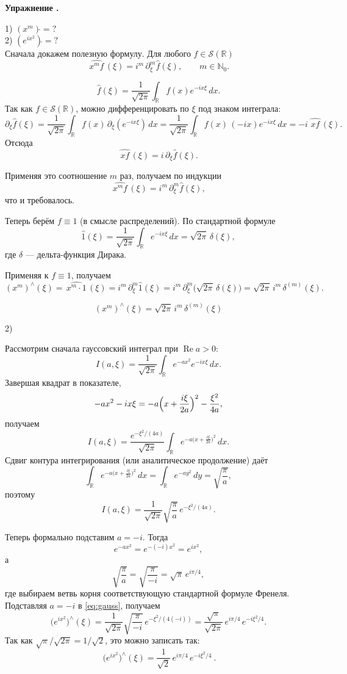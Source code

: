 \documentclass[11pt,a4paper]{report}
\numberwithin{equation}{section}
\numberwithin{figure}{chapter}
\numberwithin{table}{chapter}
\newif\ifinmathphysstatement
\newenvironment{myexe}[1][]{%
    \refstepcounter{exectr}%
    \inmathphysstatementtrue
    \begin{tcolorbox}[mathphysblock,colframe=exercisecolor,colback=exercisecolor!3,#1]
    \textbf{\color{exercisecolor}Упражнение \theexectr.}\par\smallskip
}{%
    \end{tcolorbox}
    \inmathphysstatementfalse
}
\newcommand{\R}{\mathbb{R}}
\newcommand{\SR}{\mathcal{S}(\R)}
\begin{document}
\begin{myexe}
    1) $(x^m)\hat{}=?$ \\ 
    2) $(e^{ix^2})\hat{}=?$ \\
    Сначала докажем полезную формулу. Для любого $f\in \SR$
\[
\widehat{\,x^m f\,}(\xi)=i^m\,\partial_\xi^m\widehat f(\xi),\qquad m\in\mathbb N_0.
\]


\[
\widehat f(\xi)=\frac1{\sqrt{2\pi}}\int_{\R} f(x)e^{-ix\xi}\,dx.
\]
Так как $f\in \SR$, можно дифференцировать по $\xi$ под знаком
интеграла:
\[
\partial_\xi\widehat f(\xi)
 =\frac1{\sqrt{2\pi}}\int_{\R} f(x)\,\partial_\xi(e^{-ix\xi})\,dx
 =\frac1{\sqrt{2\pi}}\int_{\R} f(x)\,(-ix)e^{-ix\xi}\,dx
 =-i\,\widehat{\,x f\,}(\xi).
\]
Отсюда
\[
\widehat{\,x f\,}(\xi)=i\,\partial_\xi\widehat f(\xi).
\]

Применяя это соотношение $m$ раз, получаем по индукции
\[
\widehat{\,x^m f\,}(\xi)
=i^m\,\partial_\xi^m\widehat f(\xi),
\]
что и требовалось.



Теперь берём $f\equiv 1$ (в смысле распределений).
По стандартной формуле
\[
\widehat 1(\xi)
=\frac1{\sqrt{2\pi}}\int_{\R} e^{-ix\xi}\,dx
=\sqrt{2\pi}\,\delta(\xi),
\]
где $\delta$ — дельта-функция Дирака.

Применяя к $f\equiv 1$, получаем
\[
(x^m)^{\wedge}(\xi)
=\widehat{\,x^m\cdot 1\,}(\xi)
=i^m\,\partial_\xi^m\widehat 1(\xi)
=i^m\,\partial_\xi^m\bigl(\sqrt{2\pi}\,\delta(\xi)\bigr)
=\sqrt{2\pi}\,i^m\,\delta^{(m)}(\xi).
\]

\[
\boxed{\ (x^m)^{\wedge}(\xi)=\sqrt{2\pi}\,i^m\,\delta^{(m)}(\xi)\ }
\]

2)

Рассмотрим сначала гауссовский интеграл при $\operatorname{Re} a>0$:
\[
I(a,\xi)=\frac1{\sqrt{2\pi}}\int_{\mathbb R} e^{-a x^2}e^{-ix\xi}\,dx.
\]
Завершая квадрат в показателе,
\[
-ax^2-ix\xi
=-a\Bigl(x+\frac{i\xi}{2a}\Bigr)^2-\frac{\xi^2}{4a},
\]
получаем
\[
I(a,\xi)
=\frac{e^{-\xi^2/(4a)}}{\sqrt{2\pi}}
  \int_{\mathbb R} e^{-a\bigl(x+\frac{i\xi}{2a}\bigr)^2}\,dx.
\]
Сдвиг контура интегрирования (или аналитическое продолжение) даёт
\[
\int_{\mathbb R} e^{-a\bigl(x+\frac{i\xi}{2a}\bigr)^2}\,dx
=\int_{\mathbb R} e^{-a y^2}\,dy
=\sqrt{\frac{\pi}{a}},
\]
поэтому
\begin{equation}\label{eq:gauss}
I(a,\xi)
=\frac1{\sqrt{2\pi}}\sqrt{\frac{\pi}{a}}\,
 e^{-\xi^2/(4a)}.
\end{equation}

Теперь формально подставим $a=-i$. Тогда
\[
e^{-a x^2}=e^{-(-i)x^2}=e^{ix^2},
\]
а
\[
\sqrt{\frac{\pi}{a}}
=\sqrt{\frac{\pi}{-i}}
=\sqrt{\pi}\,e^{i\pi/4},
\]
где выбираем ветвь корня соответствующую стандартной формуле Френеля.
Подставляя $a=-i$ в \eqref{eq:gauss}, получаем
\[
\bigl(e^{ix^2}\bigr)^{\wedge}(\xi)
=\frac1{\sqrt{2\pi}}\sqrt{\frac{\pi}{-i}}\,
 e^{-\xi^2/(4(-i))}
=\frac{\sqrt{\pi}}{\sqrt{2\pi}}\,e^{i\pi/4}\,e^{-i\xi^2/4}.
\]
Так как $\sqrt{\pi}/\sqrt{2\pi}=1/\sqrt{2}$, это можно записать так:
\[
\boxed{\ \bigl(e^{ix^2}\bigr)^{\wedge}(\xi)
=\frac{1}{\sqrt{2}}\,e^{i\pi/4}\,e^{-i\xi^2/4}\ }.
\]

\end{myexe}
\end{document}
